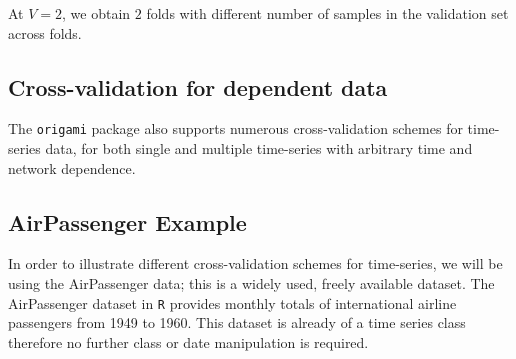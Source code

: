 \documentclass[12pt, krantz2,]{book}
\newenvironment{Shaded}{\begin{snugshade}}{\end{snugshade}}
\newcommand{\CommentTok}[1]{\textcolor[rgb]{0.56,0.35,0.01}{\textit{#1}}}
\newcommand{\DataTypeTok}[1]{\textcolor[rgb]{0.13,0.29,0.53}{#1}}
\newcommand{\DecValTok}[1]{\textcolor[rgb]{0.00,0.00,0.81}{#1}}
\newcommand{\KeywordTok}[1]{\textcolor[rgb]{0.13,0.29,0.53}{\textbf{#1}}}
\newcommand{\NormalTok}[1]{#1}
\newcommand{\StringTok}[1]{\textcolor[rgb]{0.31,0.60,0.02}{#1}}
\theoremstyle{definition}
\theoremstyle{definition}
\theoremstyle{definition}
\newcommand{\1}{\mathbbm{1}}
\begin{document}
At \(V=2\), we obtain \(2\) folds with different number of samples in the validation
set across folds.

\begin{Shaded}
\end{Shaded}

\hypertarget{cross-validation-for-dependent-data}{%
\subsection{Cross-validation for dependent data}\label{cross-validation-for-dependent-data}}

The \texttt{origami} package also supports numerous cross-validation schemes for
time-series data, for both single and multiple time-series with arbitrary time
and network dependence.

\hypertarget{airpassenger-example}{%
\subsection*{AirPassenger Example}\label{airpassenger-example}}


In order to illustrate different cross-validation schemes for time-series, we
will be using the AirPassenger data; this is a widely used, freely available
dataset. The AirPassenger dataset in \texttt{R} provides monthly totals of
international airline passengers from 1949 to 1960. This dataset is already of a
time series class therefore no further class or date manipulation is required.
\end{document}
